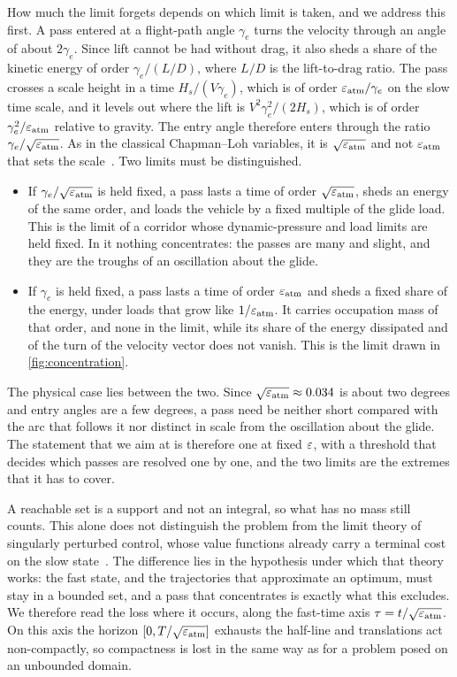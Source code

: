 \documentclass[english,11pt]{extarticle}
\begin{document}
How much the limit forgets depends on which limit is taken, and we address
this first. A pass entered at a flight-path angle $\gamma_e$ turns the
velocity through an angle of about $2\gamma_e$. Since lift cannot be had
without drag, it also sheds a share of the kinetic energy of order
$\gamma_e/(L/D)$, where $L/D$ is the lift-to-drag ratio. The pass crosses a
scale height in a time $H_s/(V\gamma_e)$, which is of order
$\varepsilon_{\mathrm{atm}}/\gamma_e$ on the slow time scale, and it levels out
where the lift is $V^2\gamma_e^2/(2H_s)$, which is of order
$\gamma_e^2/\varepsilon_{\mathrm{atm}}$ relative to gravity. The entry angle
therefore enters through the ratio $\gamma_e/\sqrt{\varepsilon_{\mathrm{atm}}}$. As
in the classical Chapman--Loh variables, it is
$\sqrt{\varepsilon_{\mathrm{atm}}}$ and not $\varepsilon_{\mathrm{atm}}$ that sets the
scale~\cite{chapman1959approximate,loh1968reentry}. Two limits must be
distinguished.
\begin{itemize}[itemsep=1pt]
  \item If $\gamma_e/\sqrt{\varepsilon_{\mathrm{atm}}}$ is held fixed, a pass lasts
    a time of order $\sqrt{\varepsilon_{\mathrm{atm}}}$, sheds an energy of the
    same order, and loads the vehicle by a fixed multiple of the glide load.
    This is the limit of a corridor whose dynamic-pressure and load limits
    are held fixed. In it nothing concentrates: the passes are many and
    slight, and they are the troughs of an oscillation about the glide.
  \item If $\gamma_e$ is held fixed, a pass lasts a time of order
    $\varepsilon_{\mathrm{atm}}$ and sheds a fixed share of the energy, under loads
    that grow like $1/\varepsilon_{\mathrm{atm}}$. It carries occupation mass of
    that order, and none in the limit, while its share of the energy
    dissipated and of the turn of the velocity vector does not vanish. This
    is the limit drawn in \cref{fig:concentration}.
\end{itemize}
The physical case lies between the two. Since
$\sqrt{\varepsilon_{\mathrm{atm}}}\approx 0.034$ is about two degrees and entry
angles are a few degrees, a pass need be neither short compared with the arc
that follows it nor distinct in scale from the oscillation about the glide.
The statement that we aim at is therefore one at fixed $\varepsilon$, with a
threshold that decides which passes are resolved one by one, and the two
limits are the extremes that it has to cover.

A reachable set is a support and not an integral, so what has no mass still
counts. This alone does not distinguish the problem from the limit theory of
singularly perturbed control, whose value functions already carry a terminal
cost on the slow state~\cite{artstein2000value}. The difference lies in the
hypothesis under which that theory works: the fast state, and the
trajectories that approximate an optimum, must stay in a bounded set, and a
pass that concentrates is exactly what this excludes. We therefore read the
loss where it occurs, along the fast-time axis
$\tau = t/\sqrt{\varepsilon_{\mathrm{atm}}}$. On this axis the horizon
$[0,T/\sqrt{\varepsilon_{\mathrm{atm}}}]$ exhausts the half-line and translations
act non-compactly, so compactness is lost in the same way as for a problem
posed on an unbounded domain.
\end{document}
